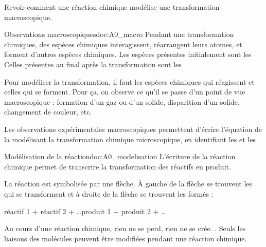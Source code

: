 \tetePremStssRedo

\vspace*{-40pt}

\begin{objectifs}
  \item Revoir comment une réaction chimique modélise une transformation macroscopique.
\end{objectifs}


\begin{doc}{Observations macroscopiques}{doc:A0_macro}
  Pendant une transformation chimiques, des espèces chimiques interagissent, réarrangent leurs atomes, et forment d'autres espèces chimiques.
  Les espèces présentes initialement sont les  Celles présentes au final après la transformation sont les 
  
  Pour modéliser la transformation, il faut  les espèces chimiques qui réagissent et celles qui se forment.
  Pour ça, on observe ce qu'il se passe d'un point de vue macroscopique : formation d'un gaz ou d'un solide, disparition d'un solide, changement de couleur, etc.
  
  \begin{importants}
    Les observations expérimentales macroscopiques permettent d'écrire l'équation de la  modélisant la transformation chimique microscopique, en identifiant les  et les 
  \end{importants}
\end{doc}

\begin{doc}{Modélisation de la réaction}{doc:A0_modelisation}
  L'écriture de la réaction chimique permet de transcrire la transformation des réactifs en produit.
  
  \begin{importants}
    La réaction est symbolisée par une flèche. À gauche de la flèche se trouvent les  qui se transforment et à droite de la flèche se trouvent les  formés :
    \begin{center}
      réactif 1 + réactif 2 + \ldots  \reaction produit 1 + produit 2 + \ldots
    \end{center}
  \end{importants}
  
  Au cours d'une réaction chimique, rien ne se perd, rien ne se crée. .
  Seuls les liaisons des molécules peuvent être modifiées pendant une réaction chimique.
\end{doc}

